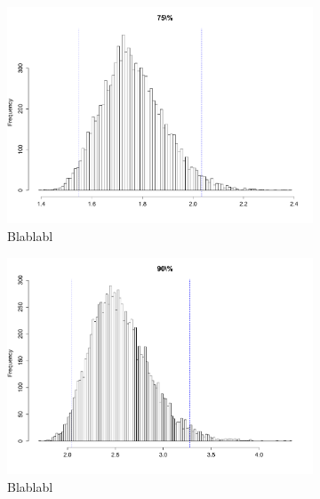 \documentclass{article}
\renewcommand*{\(}{\left(}
\renewcommand*{\)}{\right)}
\begin{document}
\begin{figure}[H]
    \centering
    \begin{subfigure}[b]{0.3\textwidth}
        \includegraphics[width = \linewidth]{img/BootstrapParamHill-75-100.pdf}
        \caption{Blablabl}
        \label{fig:BPH75} %
    \end{subfigure}%
    \begin{subfigure}[b]{0.3\textwidth}
        \includegraphics[width = \linewidth]{img/BootstrapParamHill-90-100.pdf}
        \caption{Blablabl}
        \label{fig:BPH90}
    \end{subfigure}%
    \begin{subfigure}[b]{0.3\textwidth}

\end{subfigure}
\end{figure}
\end{document}
